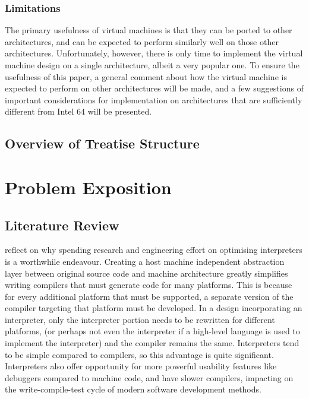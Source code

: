 		\subsection{Limitations}
			The primary usefulness of virtual machines is that they can be ported to other architectures, and can be expected to perform similarly well on those other architectures. Unfortunately, however, there is only time to implement the virtual machine design on a single architecture, albeit a very popular one. To ensure the usefulness of this paper, a general comment about how the virtual machine is expected to perform on other architectures will be made, and a few suggestions of important considerations for implementation on architectures that are sufficiently  different from Intel 64 will be presented.
				
	\section{Overview of Treatise Structure}
	

\chapter{Problem Exposition}
	\section{Literature Review}
		\cite{structureinterpreters} reflect on why spending research and engineering effort on optimising interpreters is a worthwhile endeavour. Creating a host machine independent abstraction layer between original source code and machine architecture greatly simplifies writing compilers that must generate code for many platforms. This is because for every additional platform that must be supported, a separate version of the compiler targeting that platform must be developed. In a design incorporating an interpreter, only the interpreter portion needs to be rewritten for different platforms, (or perhaps not even the interpreter if a high-level language is used to implement the interpreter) and the compiler remains the same. Interpreters tend to be simple compared to compilers, so this advantage is quite significant. Interpreters also offer opportunity for more powerful usability features like debuggers compared to machine code, and have slower compilers, impacting on the write-compile-test cycle of modern software development methods.
		
